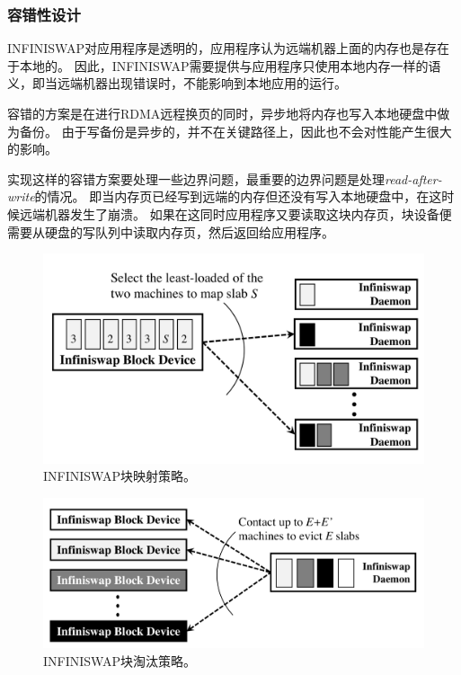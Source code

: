 \subsubsection{容错性设计}
INFINISWAP对应用程序是透明的，应用程序认为远端机器上面的内存也是存在于本地的。
因此，INFINISWAP需要提供与应用程序只使用本地内存一样的语义，即当远端机器出现错误时，不能影响到本地应用的运行。

容错的方案是在进行RDMA远程换页的同时，异步地将内存也写入本地硬盘中做为备份。
由于写备份是异步的，并不在关键路径上，因此也不会对性能产生很大的影响。

实现这样的容错方案要处理一些边界问题，最重要的边界问题是处理\emph{read-after-write}的情况。
即当内存页已经写到远端的内存但还没有写入本地硬盘中，在这时候远端机器发生了崩溃。
如果在这同时应用程序又要读取这块内存页，块设备便需要从硬盘的写队列中读取内存页，然后返回给应用程序。

\begin{figure}
\centering
\includegraphics[scale=0.3]{Figures/memory/infiniswap_slab_mapping.png}
\decoRule
\caption{INFINISWAP块映射策略\cite{gu2017efficient}。}
\label{fig:infiniswap_slab_mapping}
\end{figure}

\begin{figure}
\centering
\includegraphics[scale=0.3]{Figures/memory/infiniswap_slab_eviction.png}
\decoRule
\caption{INFINISWAP块淘汰策略\cite{gu2017efficient}。}
\label{fig:infiniswap_slab_eviction}
\end{figure}


